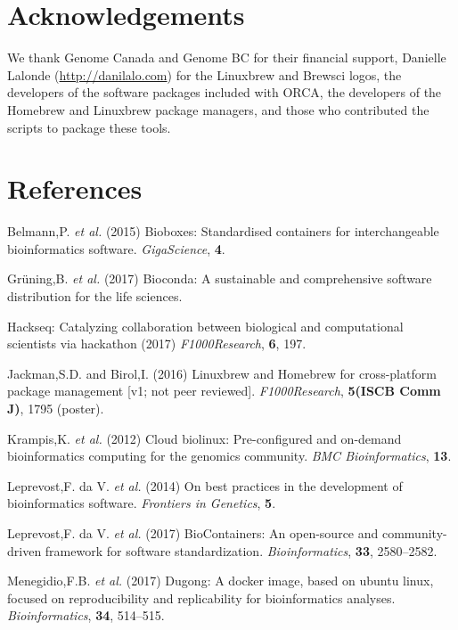 \documentclass{bioinfo}
\begin{document}
\section*{Acknowledgements}

We thank Genome Canada and Genome BC for their financial support, Danielle Lalonde (\url{http://danilalo.com}) for the Linuxbrew and Brewsci logos, the developers of the software packages included with ORCA, the developers of the Homebrew and Linuxbrew package managers, and those who contributed the scripts to package these tools.

\section*{References}

\hypertarget{refs}{}
\leavevmode\hypertarget{ref-Belmann_2015}{}%
Belmann,P. \emph{et al.} (2015) Bioboxes: Standardised containers for
interchangeable bioinformatics software. \emph{GigaScience}, \textbf{4}.

\leavevmode\hypertarget{ref-Gr_ning_2017}{}%
Gr\"uning,B. \emph{et al.} (2017) Bioconda: A sustainable and
comprehensive software distribution for the life sciences.

\leavevmode\hypertarget{ref-Hackseq_2017}{}%
Hackseq: Catalyzing collaboration between biological and computational
scientists via hackathon (2017) \emph{F1000Research}, \textbf{6}, 197.

\leavevmode\hypertarget{ref-Jackman_2016}{}%
Jackman,S.D. and Birol,I. (2016) Linuxbrew and Homebrew for
cross-platform package management {[}v1; not peer reviewed{]}.
\emph{F1000Research}, \textbf{5(ISCB Comm J)}, 1795 (poster).

\leavevmode\hypertarget{ref-Krampis_2012}{}%
Krampis,K. \emph{et al.} (2012) Cloud biolinux: Pre-configured and
on-demand bioinformatics computing for the genomics community. \emph{BMC
Bioinformatics}, \textbf{13}.

\leavevmode\hypertarget{ref-Leprevost_2014}{}%
Leprevost,F. da V. \emph{et al.} (2014) On best practices in the
development of bioinformatics software. \emph{Frontiers in Genetics},
\textbf{5}.

\leavevmode\hypertarget{ref-Leprevost_2017}{}%
Leprevost,F. da V. \emph{et al.} (2017) BioContainers: An open-source
and community-driven framework for software standardization.
\emph{Bioinformatics}, \textbf{33}, 2580--2582.

\leavevmode\hypertarget{ref-Menegidio_2017}{}%
Menegidio,F.B. \emph{et al.} (2017) Dugong: A docker image, based on
ubuntu linux, focused on reproducibility and replicability for
bioinformatics analyses. \emph{Bioinformatics}, \textbf{34}, 514--515.
\end{document}
